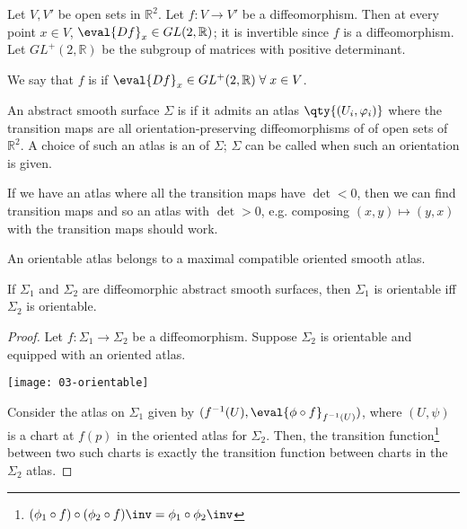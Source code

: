 \begin{definition}
	Let $V, V'$ be open sets in $\mathbb R^2$.
	Let $f \colon V \to V'$ be a diffeomorphism.
	Then at every point $x \in V$, $\eval{Df}_x \in GL(2,\mathbb R)$; it is invertible since $f$ is a diffeomorphism. \\
	Let $GL^+(2,\mathbb R)$ be the subgroup of matrices with positive determinant.

	We say that $f$ is  if $\eval{Df}_x \in GL^+(2, \mathbb{R}) \; \forall \; x \in V$.
\end{definition}

\begin{definition}[Orientable]
	An abstract smooth surface $\Sigma$ is  if it admits an atlas $\qty{(U_i, \varphi_i)}$ where the transition maps are all orientation-preserving diffeomorphisms of of open sets of $\mathbb{R}^2$.
	A choice of such an atlas is an  of $\Sigma$; $\Sigma$ can be called  when such an orientation is given.
\end{definition}

\begin{remark}
	If we have an atlas where all the transition maps have $\det < 0$, then we can find transition maps and so an atlas with $\det > 0$, e.g. composing $(x, y) \mapsto (y, x)$ with the transition maps should work.
\end{remark} 

\begin{remark}
	An orientable atlas belongs to a maximal compatible oriented smooth atlas.
\end{remark}

\begin{lemma}
	If $\Sigma_1$ and $\Sigma_2$ are diffeomorphic abstract smooth surfaces, then $\Sigma_1$ is orientable iff $\Sigma_2$ is orientable.
\end{lemma}

\begin{proof}
	Let $f \colon \Sigma_1 \to \Sigma_2$ be a diffeomorphism.
	Suppose $\Sigma_2$ is orientable and equipped with an oriented atlas.

	{\par
    \centering 
    \texttt{[image: 03-orientable]} 
	\par}

	Consider the atlas on $\Sigma_1$ given by $(f^{-1}(U), \eval{\phi \circ f}_{f^{-1}(U)})$, where $(U, \psi)$ is a chart at $f(p)$ in the oriented atlas for $\Sigma_2$.
	Then, the transition function\footnote{$(\phi_1 \circ f) \circ (\phi_2 \circ f)\inv = \phi_1 \circ \phi_2\inv$} between two such charts is exactly the transition function between charts in the $\Sigma_2$ atlas.
\end{proof}

